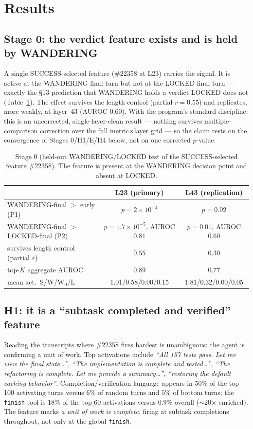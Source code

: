 \documentclass[11pt]{article}
\begin{document}
\section{Results}\label{sec:results}

\subsection{Stage 0: the verdict feature exists and is held by WANDERING}
A single SUCCESS-selected feature (\#22358 at L23) carries the signal. It is active at the WANDERING final turn but not at the LOCKED final turn --- exactly the \S13 prediction that WANDERING holds a verdict LOCKED does not (Table~\ref{tab:stage0}). The effect survives the length control (partial-$r=0.55$) and replicates, more weakly, at layer~43 (AUROC $0.60$). With the program's standard discipline: this is an uncorrected, single-layer-clean result --- nothing survives multiple-comparison correction over the full metric$\times$layer grid --- so the claim rests on the convergence of Stages 0/H1/E/H4 below, not on one corrected $p$-value.

\begin{table}[h]
\centering
\caption{Stage 0 (held-out WANDERING/LOCKED test of the SUCCESS-selected feature \#22358). The feature is present at the WANDERING decision point and absent at LOCKED.}
\label{tab:stage0}
\small
\begin{tabular}{lcc}
\toprule
 & L23 (primary) & L43 (replication) \\
\midrule
WANDERING-final $>$ early (P1) & $p=2{\times}10^{-4}$ & $p=0.02$ \\
WANDERING-final $>$ LOCKED-final (P2) & $p=1.7{\times}10^{-5}$, AUROC $0.81$ & $p=0.01$, AUROC $0.60$ \\
survives length control (partial $r$) & $0.55$ & $0.30$ \\
top-$K$ aggregate AUROC & $0.89$ & $0.77$ \\
mean act.\ S/W/W$_{0}$/L & 1.01/0.58/0.00/0.15 & 1.81/0.32/0.00/0.05 \\
\bottomrule
\end{tabular}
\end{table}

\subsection{H1: it is a ``subtask completed and verified'' feature}
Reading the transcripts where \#22358 fires hardest is unambiguous: the agent is confirming a unit of work. Top activations include \emph{``All 157 tests pass. Let me view the final state\ldots''}, \emph{``The implementation is complete and tested\ldots''}, \emph{``The refactoring is complete. Let me provide a summary\ldots''}, \emph{``restoring the default caching behavior''}. Completion/verification language appears in $50\%$ of the top-100 activating turns versus $6\%$ of random turns and $5\%$ of bottom turns; the \texttt{finish} tool is $18\%$ of the top-60 activations versus $0.9\%$ overall ($\sim$20$\times$ enriched). The feature marks \emph{a unit of work is complete}, firing at subtask completions throughout, not only at the global \texttt{finish}.
\end{document}

